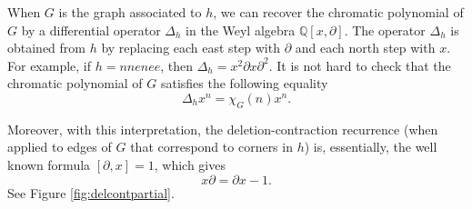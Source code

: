 \documentclass[10pt]{amsart}
\theoremstyle{definition}
\begin{document}
     When $G$ is the graph associated to $h$, we can recover the chromatic polynomial of $G$ by a differential operator $\Delta_h$ in the Weyl algebra $\mathbb{Q}[x,\partial]$. The operator $\Delta_h$ is obtained from $h$ by replacing each east step with $\partial$ and each north step with $x$. For example, if $h=nnenee$, then $\Delta_h=x^2\partial x\partial^2$. It is not hard to check that the chromatic polynomial of $G$ satisfies the following equality
   \[
   \Delta_{h}x^n=\chi_G(n)x^n.
   \]

   Moreover, with this interpretation, the deletion-contraction recurrence (when applied to edges of $G$ that correspond to corners in $h$) is, essentially, the well known formula $[\partial,x]=1$, which gives
   \begin{equation}
       \label{eq:partialx}
       x\partial=\partial x- 1.
   \end{equation}
   See Figure \ref{fig:delcontpartial}.
\end{document}
